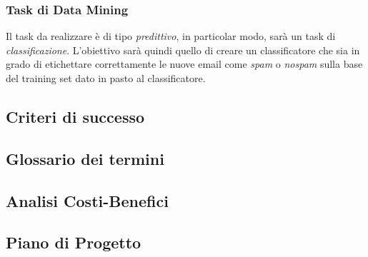 \subsubsection{Task di Data Mining}
	Il task da realizzare è di tipo \textit{predittivo}, in particolar modo, sarà un task di \textit{classificazione}. L'obiettivo sarà quindi quello di creare un classificatore che sia in grado di etichettare correttamente le nuove email come \textit{spam} o \textit{nospam} sulla base del training set dato in pasto al classificatore. 
\subsection{Criteri di successo}

\subsection{Glossario dei termini}

\subsection{Analisi Costi-Benefici}

\subsection{Piano di Progetto}